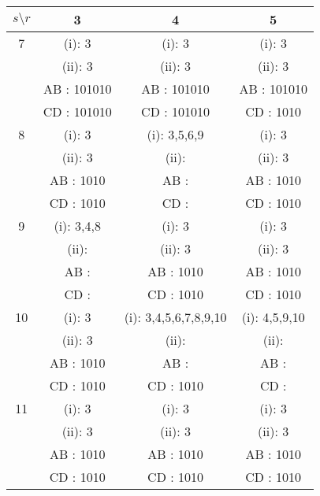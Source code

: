 \begin{table}[h]\centering
\begin{tabular}{| c || c | c | c |}
\hline 
{$s\setminus r$} & 3 &4&5 \\ \hline \hline

7 & \cellcolor{lightgray}(i): 3 & \cellcolor{lightgray}(i): 3 & \cellcolor{lightgray}(i): 3\\
 & \cellcolor{lightgray}(ii): 3 & \cellcolor{lightgray}(ii): 3 & \cellcolor{lightgray}(ii): 3\\
 & \cellcolor{lightgray}AB : 101010 & \cellcolor{lightgray}AB : 101010 & \cellcolor{lightgray}AB : 101010\\
 & \cellcolor{lightgray}CD : 101010 & \cellcolor{lightgray}CD : 101010 & \cellcolor{lightgray}CD : 1010\\\hline

8 & \cellcolor{lightgray}(i): 3 & (i): 3,5,6,9 & \cellcolor{lightgray}(i): 3\\
 & \cellcolor{lightgray}(ii): 3 & (ii):  & \cellcolor{lightgray}(ii): 3\\
 & \cellcolor{lightgray}AB : 1010 & AB :  & \cellcolor{lightgray}AB : 1010\\
 & \cellcolor{lightgray}CD : 1010 & CD :  & \cellcolor{lightgray}CD : 1010\\\hline

9 & (i): 3,4,8 & \cellcolor{lightgray}(i): 3 & \cellcolor{lightgray}(i): 3\\
 & (ii):  & \cellcolor{lightgray}(ii): 3 & \cellcolor{lightgray}(ii): 3\\
 & AB :  & \cellcolor{lightgray}AB : 1010 & \cellcolor{lightgray}AB : 1010\\
 & CD :  & \cellcolor{lightgray}CD : 1010 & \cellcolor{lightgray}CD : 1010\\\hline

10 & \cellcolor{lightgray}(i): 3 & (i): 3,4,5,6,7,8,9,10 & (i): 4,5,9,10\\
 & \cellcolor{lightgray}(ii): 3 & (ii):  & (ii): \\
 & \cellcolor{lightgray}AB : 1010 & AB :  & AB : \\
 & \cellcolor{lightgray}CD : 1010 & CD : 1010 & CD : \\\hline

11 & \cellcolor{lightgray}(i): 3 & \cellcolor{lightgray}(i): 3 & \cellcolor{lightgray}(i): 3\\
 & \cellcolor{lightgray}(ii): 3 & \cellcolor{lightgray}(ii): 3 & \cellcolor{lightgray}(ii): 3\\
 & \cellcolor{lightgray}AB : 1010 & \cellcolor{lightgray}AB : 1010 & \cellcolor{lightgray}AB : 1010\\
 & \cellcolor{lightgray}CD : 1010 & \cellcolor{lightgray}CD : 1010 & \cellcolor{lightgray}CD : 1010\\\hline


\end{tabular}
\end{table}
